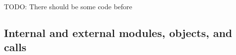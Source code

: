 TODO: There should be some code before 
 
\subsection{Internal and external modules, objects, and calls}
\label{s:concepts}

%   
% 
%

